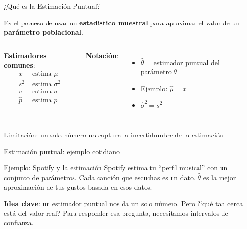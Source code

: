 \documentclass[aspectratio=169, 11pt]{beamer}
\begin{document}
\begin{frame}{¿Qué es la Estimación Puntual?}
\begin{definition}
Es el proceso de usar un \textbf{estadístico muestral} para aproximar el valor de un \textbf{parámetro poblacional}.
\end{definition}

\vspace{0.3cm}
\begin{columns}[T]
\textbf{Estimadores comunes}:
\begin{align*}
\bar{x} &\text{ estima } \mu \\
s^2 &\text{ estima } \sigma^2 \\
s &\text{ estima } \sigma \\
\hat{p} &\text{ estima } p
\end{align*}

\textbf{Notación}:
\begin{itemize}
  \item $\hat{\theta}$ = estimador puntual del parámetro $\theta$
  \item Ejemplo: $\hat{\mu} = \bar{x}$
  \item $\hat{\sigma}^2 = s^2$
\end{itemize}
\end{columns}

\alert{Limitaci\'on}: un solo n\'umero no captura la incertidumbre de la estimaci\'on
\end{frame}

\begin{frame}{Estimaci\'on puntual: ejemplo cotidiano}
\begin{exampleblock}{Ejemplo: Spotify y la estimaci\'on}
Spotify estima tu ``perfil musical'' con un conjunto de par\'ametros. Cada canci\'on que escuchas es un dato. $\hat{\theta}$ es la mejor aproximaci\'on de tus gustos basada en esos datos.
\end{exampleblock}

\vspace{0.5em}
\textbf{Idea clave}: un estimador puntual nos da un solo n\'umero. Pero ?`qu\'e tan cerca est\'a del valor real? Para responder esa pregunta, necesitamos \alert{intervalos de confianza}.
\end{frame}
\end{document}
